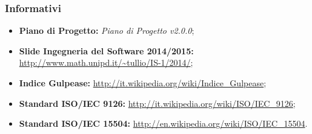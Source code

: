 	\subsubsection{Informativi}
	\begin{itemize}
		\item \textbf{Piano di Progetto:} \textit{Piano di Progetto v2.0.0};
		\item \textbf{\gls{Slide} Ingegneria del Software 2014/2015:} \url{http://www.math.unipd.it/~tullio/IS-1/2014/};
		\item \textbf{Indice {Gulpease}:} \url{http://it.wikipedia.org/wiki/Indice_Gulpease};
		\item \textbf{Standard ISO/IEC 9126:} \url{http://it.wikipedia.org/wiki/ISO/IEC_9126};
		\item \textbf{Standard ISO/IEC 15504:} \url{http://en.wikipedia.org/wiki/ISO/IEC_15504}.
	\end{itemize}

